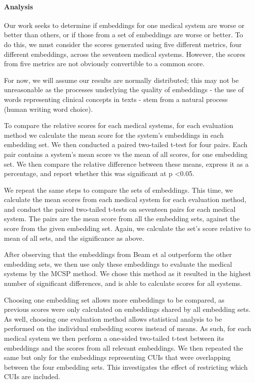 \documentclass[11pt,a4paper]{article}
\begin{document}
\paragraph{Analysis}
Our work seeks to determine if embeddings for one medical system are worse or better than others, or if those from a set of embeddings are worse or better. To do this, we must consider the scores generated using five different metrics, four different embeddings, across the seventeen medical systems. However, the scores from five metrics are not obviously convertible to a common score.  

For now, we will assume our results are normally distributed; this may not be unreasonable as the processes underlying the quality of embeddings - the use of words representing clinical concepts in texts - stem from a natural process (human writing word choice).

To compare the relative scores for each medical systems, for each evaluation method we calculate the mean score for the system's embeddings in each embedding set. We then conducted a paired two-tailed t-test for four pairs. Each pair contains a system's mean score vs the mean of all scores, for one embedding set. We then compare the relative difference between these means, express it as a percentage, and report whether this was significant at p \textless 0.05. 

We repeat the same steps to compare the sets of embeddings. This time, we calculate the mean scores from each medical system for each evaluation method, and conduct the paired two-tailed t-tests on seventeen pairs for each medical system. The pairs are the mean score from all the embedding sets, against the score from the given embedding set. Again, we calculate the set's score relative to mean of all sets, and the significance as above. 

After observing that the embeddings from Beam et al outperform the other embedding sets, we then use only these embeddings to evaluate the medical systems by the MCSP method. We chose this method  as it resulted in the highest number of significant differences, and is able to calculate scores for all systems. 

Choosing one embedding set allows more embeddings to be compared, as previous scores were only calculated on embeddings shared by all embedding sets. As well, choosing one evaluation method  allows statistical analysis to be performed on the individual embedding scores instead of means. As such, for each medical system we then perform a one-sided two-tailed t-test between its embeddings and the scores from all relevant embeddings. We then repeated the same but only for the embeddings representing CUIs that were overlapping between the four embedding sets. This investigates the effect of restricting which CUIs are included.  
\end{document}
